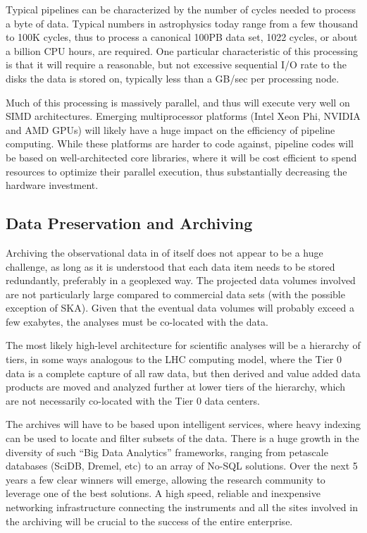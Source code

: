 Typical pipelines can be characterized by the number of cycles needed
to process a byte of data. Typical numbers in astrophysics today range
from a few thousand to 100K cycles, thus to process a canonical 100PB
data set, 1022 cycles, or about a billion CPU hours, are required. One
particular characteristic of this processing is that it will require a
reasonable, but not excessive sequential I/O rate to the disks the
data is stored on, typically less than a GB/sec per processing node.

Much of this processing is massively parallel, and thus will execute
very well on SIMD architectures. Emerging multiprocessor platforms
(Intel Xeon Phi, NVIDIA and AMD GPUs) will likely have a huge impact
on the efficiency of pipeline computing. While these platforms are
harder to code against, pipeline codes will be based on
well-architected core libraries, where it will be cost efficient to
spend resources to optimize their parallel execution, thus
substantially decreasing the hardware investment.

\subsection{Data Preservation and Archiving} 

Archiving the observational data in of itself does not appear to be a
huge challenge, as long as it is understood that each data item needs
to be stored redundantly, preferably in a geoplexed way. The projected
data volumes involved are not particularly large compared to
commercial data sets (with the possible exception of SKA). Given that
the eventual data volumes will probably exceed a few exabytes, the
analyses must be co-located with the data.

The most likely high-level architecture for scientific analyses will
be a hierarchy of tiers, in some ways analogous to the LHC computing
model, where the Tier 0 data is a complete capture of all raw data,
but then derived and value added data products are moved and analyzed
further at lower tiers of the hierarchy, which are not necessarily
co-located with the Tier 0 data centers.

The archives will have to be based upon intelligent services, where
heavy indexing can be used to locate and filter subsets of the
data. There is a huge growth in the diversity of such “Big Data
Analytics” frameworks, ranging from petascale databases (SciDB,
Dremel, etc) to an array of No-SQL solutions. Over the next 5 years a
few clear winners will emerge, allowing the research community to
leverage one of the best solutions. A high speed, reliable and
inexpensive networking infrastructure connecting the instruments and
all the sites involved in the archiving will be crucial to the success
of the entire enterprise.


